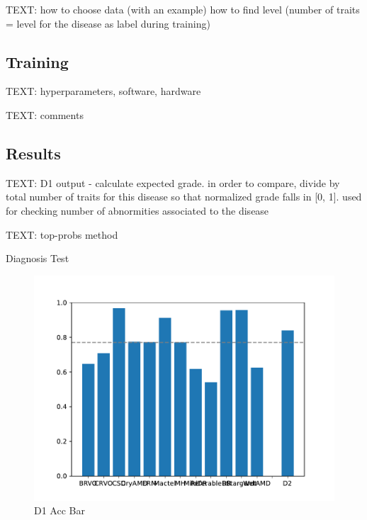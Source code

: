 \documentclass{article}
\begin{document}
	TEXT: how to choose data (with an example)
	how to find level (number of traits = level for the disease as label during training)
	
	
	\subsection{Training}
	
	TEXT: hyperparameters, software, hardware
	
	TEXT: comments
	
	
	\subsection{Results}
	
	TEXT: D1 output - calculate expected grade. in order to compare, divide by total number of traits for this disease so that normalized grade falls in [0, 1]. 
	used for checking number of abnormities associated to the disease
	
	TEXT: top-probs method
	
	\begin{table}[htbp]
		\centering
		\caption{Diagnosis Test}
		\label{tb:diagnosis_test}
	\end{table}
	
	\begin{figure}[htbp]
		\centering
		\includegraphics[width=\linewidth]{Figs/diagnosis1_acc_barchart.pdf}
		\caption{D1 Acc Bar}
		\vspace{0.3cm}
		\label{fig:D1_acc_bar}
	\end{figure}
	
\end{document}
